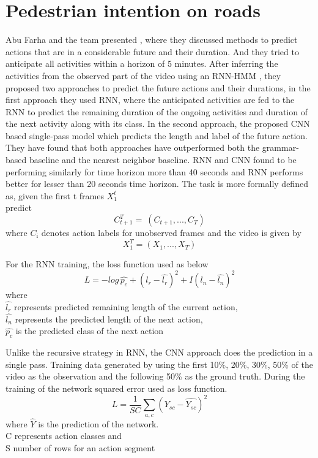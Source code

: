 \section{Pedestrian intention on roads}
\newpara Abu Farha and the team presented \cite{abu2018will}, where they discussed methods to predict actions that are in a considerable future and their duration. And they tried to anticipate all activities within a horizon of 5 minutes. After inferring the activities from the observed part of the video using an RNN-HMM \cite{richard2017weakly}, they proposed two approaches to predict the future actions and their durations, in the first approach they used RNN, where the anticipated activities are fed to the RNN to predict the remaining duration of the ongoing activities and duration of the next activity along with its class.
In the second approach, the proposed CNN based single-pass model which predicts the length and label of the future action. They have found that both approaches have outperformed both the grammar-based baseline and the nearest neighbor baseline. RNN and CNN found to be performing similarly for time horizon more than 40 seconds and RNN performs better for lesser than 20 seconds time horizon. The task is more formally defined as,
given the first t frames $X_{\text{1}}^t$ \\
predict \[ C_{t+1}^T  = \ (C_{t+1}, ..., C_{T}) \]
where $C_{\text{i}}$ denotes action labels for unobserved frames
and the video is given by
\[ X_{1}^T = (X_{1}, ..., X_{T}) \]

\newpara
For the RNN training, the loss function used as below
\begin{equation}
    L = -log\, \hat{p_c} + (l_r - \hat{l_r})^2 +  I (l_n - \hat{l_n})^2 
\end{equation}
where \\
$\hat{l_r}$ represents predicted remaining length of the current action, \\
$\hat{l_n}$ represents the predicted length of the next action, \\
$\hat{p_c}$ is the predicted class of the next action

\newpara Unlike the recursive strategy in RNN, the CNN approach does the prediction in a single pass.
Training data generated by using the first 10\%, 20\%, 30\%, 50\% of the video as the observation and the following 50\% as the ground truth. During the training of the network squared error used as loss function.
\begin{equation}
    L = \frac{1} {SC} \sum_{a,c} (Y_{sc} - \hat{Y_{sc}})^2 
\end{equation}
where $\hat{Y}$ is the prediction of the network. \\
C represents action classes and \\
S number of rows for an action segment

